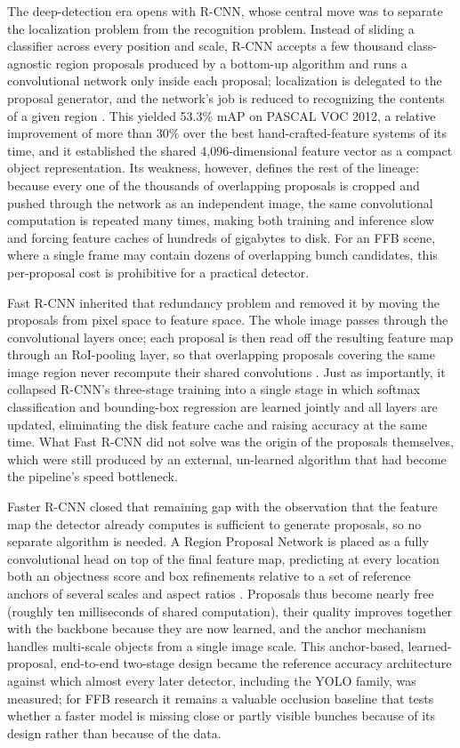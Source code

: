 The deep-detection era opens with R-CNN, whose central move was to separate the localization problem from the recognition problem. Instead of sliding a classifier across every position and scale, R-CNN accepts a few thousand class-agnostic region proposals produced by a bottom-up algorithm and runs a convolutional network only inside each proposal; localization is delegated to the proposal generator, and the network's job is reduced to recognizing the contents of a given region \cite{girshick2014rcnn}. This yielded 53.3\% mAP on PASCAL VOC 2012, a relative improvement of more than 30\% over the best hand-crafted-feature systems of its time, and it established the shared 4{,}096-dimensional feature vector as a compact object representation. Its weakness, however, defines the rest of the lineage: because every one of the thousands of overlapping proposals is cropped and pushed through the network as an independent image, the same convolutional computation is repeated many times, making both training and inference slow and forcing feature caches of hundreds of gigabytes to disk. For an FFB scene, where a single frame may contain dozens of overlapping bunch candidates, this per-proposal cost is prohibitive for a practical detector.

Fast R-CNN inherited that redundancy problem and removed it by moving the proposals from pixel space to feature space. The whole image passes through the convolutional layers once; each proposal is then read off the resulting feature map through an RoI-pooling layer, so that overlapping proposals covering the same image region never recompute their shared convolutions \cite{girshick2015fastrcnn}. Just as importantly, it collapsed R-CNN's three-stage training into a single stage in which softmax classification and bounding-box regression are learned jointly and all layers are updated, eliminating the disk feature cache and raising accuracy at the same time. What Fast R-CNN did not solve was the origin of the proposals themselves, which were still produced by an external, un-learned algorithm that had become the pipeline's speed bottleneck.

Faster R-CNN closed that remaining gap with the observation that the feature map the detector already computes is sufficient to generate proposals, so no separate algorithm is needed. A Region Proposal Network is placed as a fully convolutional head on top of the final feature map, predicting at every location both an objectness score and box refinements relative to a set of reference anchors of several scales and aspect ratios \cite{ren2017fasterrcnn}. Proposals thus become nearly free (roughly ten milliseconds of shared computation), their quality improves together with the backbone because they are now learned, and the anchor mechanism handles multi-scale objects from a single image scale. This anchor-based, learned-proposal, end-to-end two-stage design became the reference accuracy architecture against which almost every later detector, including the YOLO family, was measured; for FFB research it remains a valuable occlusion baseline that tests whether a faster model is missing close or partly visible bunches because of its design rather than because of the data.

